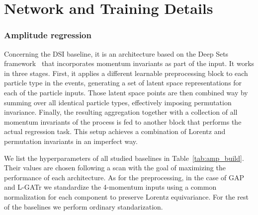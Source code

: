 \documentclass[submission, Phys]{SciPost}
\begin{document}
%


\appendix
\section{Network and Training Details}
\label{app:hyperparams}

\subsubsection*{Amplitude regression}

Concerning the DSI baseline, it is an architecture based on the Deep Sets framework~\cite{zaheer2017deep} that incorporates momentum invariants as part of the input. It works in three stages. First, it applies a different learnable preprocessing block to each particle type in the events, generating a set of latent space representations for each of the particle inputs. Those latent space points are then combined way by summing over all identical particle types, effectively imposing permutation invariance. Finally, the resulting aggregation together with a collection of all momentum invariants of the process is fed to another block that performs the actual regression task. This setup achieves a combination of Lorentz and permutation invariants in an imperfect way.

We list the hyperparameters of all studied baselines in Table~\ref{tab:amp_build}. Their values are chosen following a scan with the goal of maximizing the performance of each architecture. As for the preprocessing, in the case of GAP and L-GATr we standardize the 4-momentum inputs using a common normalization for each component to preserve Lorentz equivariance. For the rest of the baselines we perform ordinary standarization.
\end{document}
